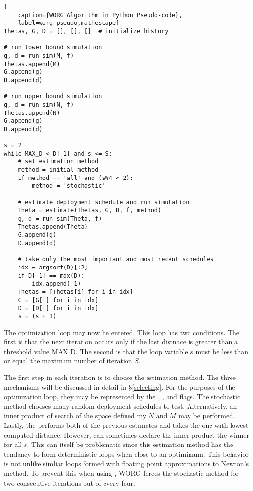 \clearpage
\begin{lstlisting}[
    caption={WORG Algorithm in Python Pseudo-code},
    label=worg-pseudo,mathescape]
Thetas, G, D = [], [], []  # initialize history

# run lower bound simulation
g, d = run_sim(M, f)
Thetas.append(M)
G.append(g)
D.append(d)

# run upper bound simulation    
g, d = run_sim(N, f)
Thetas.append(N)
G.append(g)
D.append(d)

s = 2
while MAX_D < D[-1] and s <= S:
    # set estimation method
    method = initial_method
    if method == 'all' and (s%4 < 2):
        method = 'stochastic'

    # estimate deployment schedule and run simulation
    Theta = estimate(Thetas, G, D, f, method)
    g, d = run_sim(Theta, f)
    Thetas.append(Theta)
    G.append(g)
    D.append(d)

    # take only the most important and most recent schedules
    idx = argsort(D)[:2]
    if D[-1] == max(D):
        idx.append(-1)
    Thetas = [Thetas[i] for i in idx]
    G = [G[i] for i in idx]
    D = [D[i] for i in idx]
    s = (s + 1)
\end{lstlisting}
\clearpage

The optimization loop may now be entered.  This loop has two conditions.
The first is that the next iteration occurs only if the last distnace
is greater than a threshold value $\mathrm{MAX\_D}$. The second is that 
the loop variable $s$ must be less than or equal the maximum number
of iteration $S$.

The first step in each iteration is to choose the estimation method. The
three mechanisms will be discussed in detail in \S\ref{selecting}. For
the purposes of the optimization loop, they may be represented by the 
\stochastic, \innerprod, and \allflag flags. The stochastic method 
chooses many random deployment schedules to test. Alternatively, an inner
product of search of the space defined my $N$ and $M$ may be performed. 
Lastly, the \allflag performs both of the previous estimates and takes
the one with lowest computed distance.  However, \allflag can sometimes
declare the inner product the winner for all $s$.  This can itself 
be problematic since this estimation method has the tendancy to form 
deterministic loops when close to an optimimum. This behavior is not unlike
simliar loops formed with floating point approximations to Newton's method.
To prevent this when using \allflag, WORG forces the stochastic method
for two consecutive iterations out of every four.  
 

